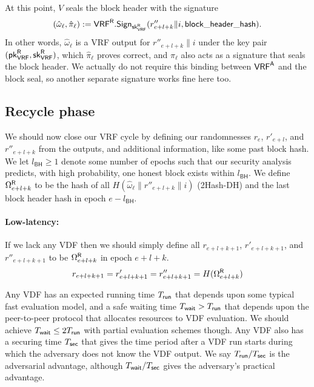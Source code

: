 At this point, $V$ seals the block header with the signature
$$ (\hat{\omega}_{\ell},\hat{\pi}_{\ell}) := \mathsf{VRF}^{\mathsf{R}}.\mathsf{Sign}_{\mathsf{sk}_{\mathsf{VRF}}^{\mathsf{R}}}(r''_{e+l+k} \| i, \mathsf{block\_header\_hash}) . $$
In other words, $\hat{\omega}_{\ell}$ is a VRF output for $r''_{e+l+k} \| i$ under the key pair $(\mathsf{pk}_{\mathsf{VRF}}^{\mathsf{R}},\mathsf{sk}_{\mathsf{VRF}}^{\mathsf{R}})$, which $\hat{\pi}_{\ell}$ proves correct, and $\hat{\pi}_{\ell}$ also acts as a signature that seals the block header.  We actually do not require this binding between $\mathsf{VRF}^{\mathsf{A}}$ and the block seal, so another separate signature works fine here too.


\subsection{Recycle phase}\label{subsec:recycle_phase}
\newcommand\id{\mathsf{id}}
\newcommand{\epochsdelayforblockhash}{l_{\mathsf{BH}}}
\newcommand{\epochsdelayforVDF}{l_{\mathsf{VDF}}}

We should now close our VRF cycle by defining our randomnesses $r_e$, $r'_{e+l}$, and $r''_{e+l+k}$ from the \VRFr outputs, and additional information, like some past block hash.  We let $\epochsdelayforblockhash \ge 1$ denote some number of epochs such that our security analysis predicts, with high probability, one honest block exists within $\epochsdelayforblockhash$.  We define $\Omega^{\mathsf{R}}_{e+l+k}$ to be the hash of all $H(\hat{\omega}_{\ell} \| r''_{e+l+k} \| i)$ (2Hash-DH) and the last block header hash in epoch $e - \epochsdelayforblockhash$.

\paragraph{Low-latency:} 
If we lack any VDF then we should simply define all $r_{e+l+k+1}$, $r'_{e+l+k+1}$, and $r''_{e+l+k+1}$ to be $\Omega^{\mathsf{R}}_{e+l+k}$ in epoch $e+l+k$.
$$
r_{e+l+k+1} = r'_{e+l+k+1} = r''_{e+l+k+1} = H(\Omega^{\mathsf{R}}_{e+l+k})
$$

Any VDF has an expected running time $T_{\mathsf{run}}$ that depends upon some typical fast evaluation model, and a safe waiting time $T_{\mathsf{wait}} > T_{\mathsf{run}}$ that depends upon the peer-to-peer protocol that allocates resources to VDF evaluation.  We should achieve $T_{\mathsf{wait}} \le 2 T_{\mathsf{run}}$ with partial evaluation schemes though.  Any VDF also has a securing time $T_{\mathsf{sec}}$ that gives the time period after a VDF run starts during which the adversary does not know the VDF output.  We say $T_{\mathsf{run}}/T_{\mathsf{sec}}$ is the adversarial advantage, although $T_{\mathsf{wait}}/T_{\mathsf{sec}}$ gives the adversary's practical advantage.  

